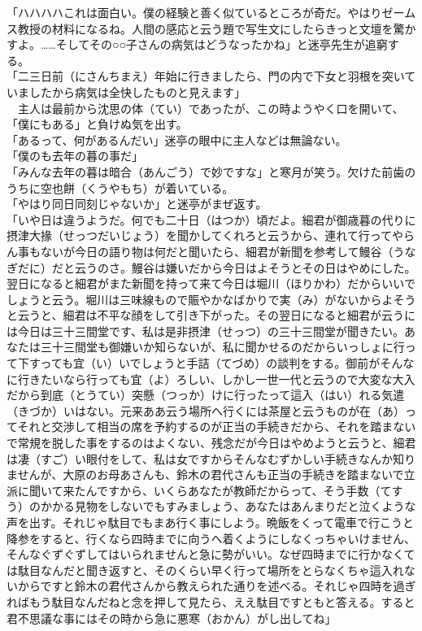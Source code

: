 「ハハハハこれは面白い。僕の経験と善く似ているところが奇だ。やはりゼームス教授の材料になるね。人間の感応と云う題で写生文にしたらきっと文壇を驚かすよ。\ldots{}\ldots{}そしてその○○子さんの病気はどうなったかね」と迷亭先生が追窮する。\\
「二三日前（にさんちまえ）年始に行きましたら、門の内で下女と羽根を突いていましたから病気は全快したものと見えます」\\
　主人は最前から沈思の体（てい）であったが、この時ようやく口を開いて、「僕にもある」と負けぬ気を出す。\\
「あるって、何があるんだい」迷亭の眼中に主人などは無論ない。\\
「僕のも去年の暮の事だ」\\
「みんな去年の暮は暗合（あんごう）で妙ですな」と寒月が笑う。欠けた前歯のうちに空也餅（くうやもち）が着いている。\\
「やはり同日同刻じゃないか」と迷亭がまぜ返す。\\
「いや日は違うようだ。何でも二十日（はつか）頃だよ。細君が御歳暮の代りに摂津大掾（せっつだいじょう）を聞かしてくれろと云うから、連れて行ってやらん事もないが今日の語り物は何だと聞いたら、細君が新聞を参考して鰻谷（うなぎだに）だと云うのさ。鰻谷は嫌いだから今日はよそうとその日はやめにした。翌日になると細君がまた新聞を持って来て今日は堀川（ほりかわ）だからいいでしょうと云う。堀川は三味線もので賑やかなばかりで実（み）がないからよそうと云うと、細君は不平な顔をして引き下がった。その翌日になると細君が云うには今日は三十三間堂です、私は是非摂津（せっつ）の三十三間堂が聞きたい。あなたは三十三間堂も御嫌いか知らないが、私に聞かせるのだからいっしょに行って下すっても宜（い）いでしょうと手詰（てづめ）の談判をする。御前がそんなに行きたいなら行っても宜（よ）ろしい、しかし一世一代と云うので大変な大入だから到底（とうてい）突懸（つっか）けに行ったって這入（はい）れる気遣（きづか）いはない。元来ああ云う場所へ行くには茶屋と云うものが在（あ）ってそれと交渉して相当の席を予約するのが正当の手続きだから、それを踏まないで常規を脱した事をするのはよくない、残念だが今日はやめようと云うと、細君は凄（すご）い眼付をして、私は女ですからそんなむずかしい手続きなんか知りませんが、大原のお母あさんも、鈴木の君代さんも正当の手続きを踏まないで立派に聞いて来たんですから、いくらあなたが教師だからって、そう手数（てすう）のかかる見物をしないでもすみましょう、あなたはあんまりだと泣くような声を出す。それじゃ駄目でもまあ行く事にしよう。晩飯をくって電車で行こうと降参をすると、行くなら四時までに向うへ着くようにしなくっちゃいけません、そんなぐずぐずしてはいられませんと急に勢がいい。なぜ四時までに行かなくては駄目なんだと聞き返すと、そのくらい早く行って場所をとらなくちゃ這入れないからですと鈴木の君代さんから教えられた通りを述べる。それじゃ四時を過ぎればもう駄目なんだねと念を押して見たら、ええ駄目ですともと答える。すると君不思議な事にはその時から急に悪寒（おかん）がし出してね」\\
